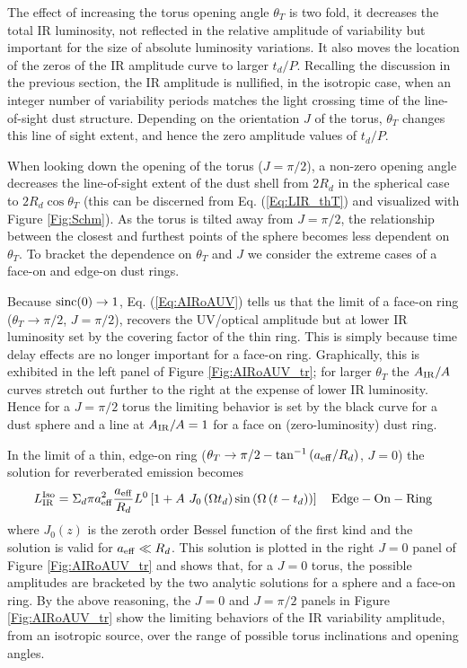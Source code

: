 The effect of increasing the torus opening angle $\theta_T$ is two fold, it
decreases the total IR luminosity, not reflected in the relative amplitude of
variability but important for the size of absolute luminosity variations. It
also moves the location of the zeros of the IR amplitude curve to larger
$t_d/P$. Recalling the discussion in the previous section, the IR amplitude is
nullified, in the isotropic case, when an integer number of variability
periods matches the light crossing time of the line-of-sight dust structure.
Depending on the orientation $J$ of the torus, $\theta_T$ changes this line of
sight extent, and hence the zero amplitude values of $t_d/P$.

 

When looking down the opening of the torus ($J=\pi/2$), a non-zero opening
angle decreases the line-of-sight extent of the dust shell from $2 R_d$ in the
spherical case to $2 R_d\cos{\theta_T}$ (this can be discerned from Eq.
(\ref{Eq:LIR_thT}) and visualized with Figure \ref{Fig:Schm}). As the torus is
tilted away from $J=\pi/2$, the relationship between the closest and furthest
points of the sphere becomes less dependent on $\theta_T$. To bracket the
dependence on $\theta_T$ and $J$ we consider the extreme cases of a face-on
and edge-on dust rings.

Because $\rm{sinc}{(0)}\rightarrow 1$, Eq. (\ref{Eq:AIRoAUV}) tells us that
the limit of a face-on ring ($\theta_T \rightarrow \pi/2$, $J=\pi/2$),
recovers the UV/optical amplitude but at lower IR luminosity set by the
covering factor of the thin ring. This is simply because time delay effects
are no longer important for a face-on ring. Graphically, this is exhibited in
the left panel of Figure \ref{Fig:AIRoAUV_tr}; for larger $\theta_T$ the
$A_{\rm{IR}}/A$ curves stretch out further to the right at the expense of
lower IR luminosity. Hence for a $J=\pi/2$ torus the limiting behavior is set
by the black curve for a dust sphere and a line at $A_{\rm{IR}}/A=1$ for a
face on (zero-luminosity) dust ring.

In the limit of a thin, edge-on ring ($\theta_T \rightarrow \pi/2 -
\tan^{-1}{(a_{\rm{eff}}/R_d)}$, $J=0$) the solution for reverberated emission
becomes
\begin{equation}
L^{\rm{Iso}}_{\rm{IR}} =  \Sigma_d \pi  a^2_{\eff} \frac{ a_{\rm{eff}} }{ R_d } L^0  \left[ 1 +  A  \ J_0\left( \Omega t_d \right)  \sin{ \left( \Omega \left( t - t_d \right) \right)  } 
   \right] \quad \rm{Edge-On-Ring}
   \label{Eq:ISO_Ring}
\end{equation}
where $J_0(z)$ is the zeroth order Bessel function of the first kind and the
solution is valid for $a_{\rm{eff}} \ll R_d$. This solution is plotted in the
right $J=0$ panel of Figure \ref{Fig:AIRoAUV_tr} and shows that, for a $J=0$
torus, the possible amplitudes are bracketed by the two analytic solutions for
a sphere and a face-on ring. By the above reasoning, the $J=0$ and $J=\pi/2$
panels in Figure \ref{Fig:AIRoAUV_tr} show the limiting behaviors of the IR
variability amplitude, from an isotropic source, over the range of possible
torus inclinations and opening angles.




